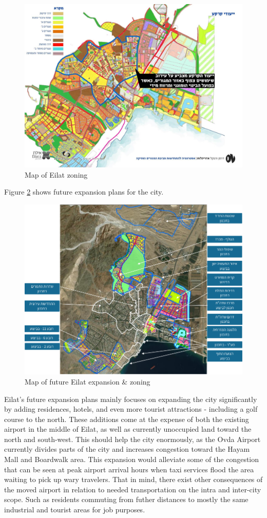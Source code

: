 \documentclass[12pt]{article}                       %
\begin{document}
\begin{figure}[H]
    \centering
    \includegraphics[width=12cm]{images/eilat_zoning.jpg}
    \caption{Map of Eilat zoning}
    \label{img:eilat_zoning}
\end{figure}
Figure \ref{img:eilat_expansion} shows future expansion plans for the city.

\begin{figure}[H]
    \centering
    \includegraphics[width=12cm]{images/eilat_zoning_future.png}
    \caption{Map of future Eilat expansion \& zoning}
    \label{img:eilat_expansion}
\end{figure}

Eilat's future expansion plans mainly focuses on expanding the city significantly by adding residences, hotels, and even more tourist attractions - including a golf course to the north. These additions come at the expense of both the existing airport in the middle of Eilat, as well as currently unoccupied land toward the north and south-west. This should help the city enormously, as the Ovda Airport currently divides parts of the city and increases congestion toward the Hayam Mall and Boardwalk area.  This expansion would alleviate some of the congestion that can be seen at peak airport arrival hours when taxi services flood the area waiting to pick up wary travelers. That in mind, there exist other consequences of the moved airport in relation to needed transportation on the intra and inter-city scope. Such as residents commuting from futher distances to mostly the same industrial and tourist areas for job purposes. 
\end{document}
